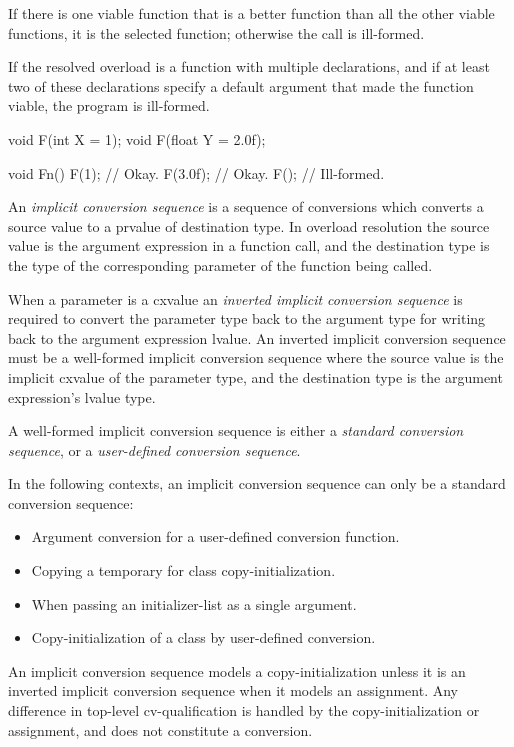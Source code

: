 \p If there is one viable function that is a better function than all the other
viable functions, it is the selected function; otherwise the call is ill-formed.

\p If the resolved overload is a function with multiple declarations, and if at
least two of these declarations specify a default argument that made the
function viable, the program is ill-formed.

\begin{HLSL}
void F(int X = 1);
void F(float Y = 2.0f);

void Fn() {
  F(1);     // Okay.
  F(3.0f);  // Okay.
  F();      // Ill-formed.
}
\end{HLSL}


\p An \textit{implicit conversion sequence} is a sequence of conversions which
converts a source value to a prvalue of destination type. In overload resolution
the source value is the argument expression in a function call, and the
destination type is the type of the corresponding parameter of the function
being called.

\p When a parameter is a cxvalue an \textit{inverted implicit conversion sequence} is
required to convert the parameter type back to the argument type
for writing back to the argument expression lvalue. An inverted implicit
conversion sequence must be a well-formed implicit conversion sequence where the
source value is the implicit cxvalue of the parameter type, and the destination
type is the argument expression's lvalue type.

\p A well-formed implicit conversion sequence is either a \textit{standard conversion
sequence}, or a \textit{user-defined conversion sequence}.

\p In the following contexts, an implicit conversion sequence can only be a
standard conversion sequence:

\begin{itemize}
  \item Argument conversion for a user-defined conversion function.
  \item Copying a temporary for class copy-initialization.
  \item When passing an initializer-list as a single argument.
  \item Copy-initialization of a class by user-defined conversion.
\end{itemize}

\p An implicit conversion sequence models a copy-initialization unless it is an
inverted implicit conversion sequence when it models an assignment. Any
difference in top-level cv-qualification is handled by the copy-initialization
or assignment, and does not constitute a conversion.

